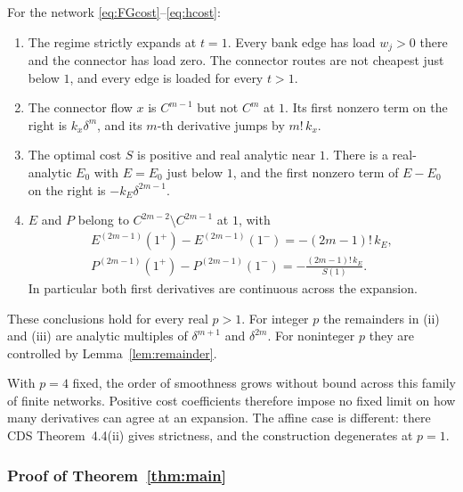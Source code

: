 \begin{theorem}\label{thm:main}
For the network \eqref{eq:FGcost}--\eqref{eq:hcost}:
\begin{enumerate}[label=(\roman*),nosep]
\item The regime strictly expands at $t=1$. Every bank edge has load $w_j>0$ there and the connector has load zero. The connector routes are not cheapest just below $1$, and every edge is loaded for every $t>1$.
\item The connector flow $x$ is $C^{m-1}$ but not $C^m$ at $1$. Its first nonzero term on the right is $k_x\delta^m$, and its $m$-th derivative jumps by $m!\,k_x$.
\item The optimal cost $S$ is positive and real analytic near $1$. There is a real-analytic $E_0$ with $E=E_0$ just below $1$, and the first nonzero term of $E-E_0$ on the right is $-k_E\delta^{2m-1}$.
\item $E$ and $P$ belong to $C^{2m-2}\setminus C^{2m-1}$ at $1$, with
\begin{equation}\label{eq:Ejump}
\begin{gathered}
 E^{(2m-1)}(1^+)-E^{(2m-1)}(1^-)=-(2m-1)!\,k_E,\\
 P^{(2m-1)}(1^+)-P^{(2m-1)}(1^-)=-\frac{(2m-1)!\,k_E}{S(1)}.
\end{gathered}
\end{equation}
In particular both first derivatives are continuous across the expansion.
\end{enumerate}
These conclusions hold for every real $p>1$. For integer $p$ the remainders in (ii) and (iii) are analytic multiples of $\delta^{m+1}$ and $\delta^{2m}$. For noninteger $p$ they are controlled by Lemma~\ref{lem:remainder}.
\end{theorem}

With $p=4$ fixed, the order of smoothness grows without bound across this family of finite networks. Positive cost coefficients therefore impose no fixed limit on how many derivatives can agree at an expansion. The affine case is different: there CDS Theorem~4.4(ii) gives strictness, and the construction degenerates at $p=1$.

\subsubsection*{Proof of Theorem~\ref{thm:main}}

